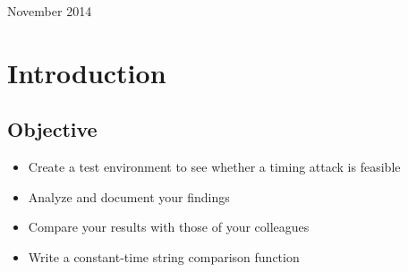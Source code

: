 \documentclass{article}
\begin{document}
\begin{titlepage}
\begin{center}
  \vspace{15 mm}


  {\large November 2014}\\[3cm] %




  \vfill %
  \end{center}
  \end{titlepage}



  \section{Introduction}

  \subsection{Objective}

  \begin{itemize}
    \item Create a test environment to see whether a timing attack is feasible
    \item  Analyze and document your findings
    \item Compare your results with those of your colleagues
    \item Write a constant-time string comparison function
  \end{itemize}
\end{document}
